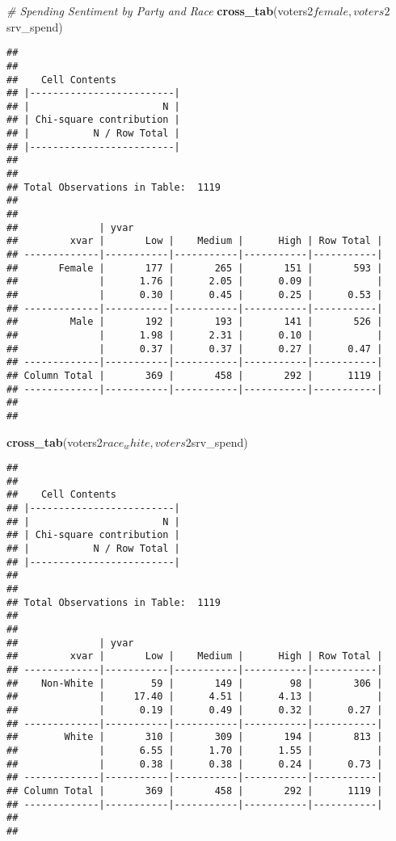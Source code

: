 \documentclass[]{article}
\newenvironment{Shaded}{\begin{snugshade}}{\end{snugshade}}
\newcommand{\KeywordTok}[1]{\textcolor[rgb]{0.13,0.29,0.53}{\textbf{{#1}}}}
\newcommand{\CommentTok}[1]{\textcolor[rgb]{0.56,0.35,0.01}{\textit{{#1}}}}
\newcommand{\NormalTok}[1]{{#1}}
\begin{document}
\begin{Shaded}
\begin{Highlighting}[]
\CommentTok{# Spending Sentiment by Party and Race}
\KeywordTok{cross_tab}\NormalTok{(voters2$female, voters2$srv_spend)}
\end{Highlighting}
\end{Shaded}

\begin{verbatim}
## 
##  
##    Cell Contents
## |-------------------------|
## |                       N |
## | Chi-square contribution |
## |           N / Row Total |
## |-------------------------|
## 
##  
## Total Observations in Table:  1119 
## 
##  
##              | yvar 
##         xvar |       Low |    Medium |      High | Row Total | 
## -------------|-----------|-----------|-----------|-----------|
##       Female |       177 |       265 |       151 |       593 | 
##              |      1.76 |      2.05 |      0.09 |           | 
##              |      0.30 |      0.45 |      0.25 |      0.53 | 
## -------------|-----------|-----------|-----------|-----------|
##         Male |       192 |       193 |       141 |       526 | 
##              |      1.98 |      2.31 |      0.10 |           | 
##              |      0.37 |      0.37 |      0.27 |      0.47 | 
## -------------|-----------|-----------|-----------|-----------|
## Column Total |       369 |       458 |       292 |      1119 | 
## -------------|-----------|-----------|-----------|-----------|
## 
## 
\end{verbatim}

\begin{Shaded}
\begin{Highlighting}[]
\KeywordTok{cross_tab}\NormalTok{(voters2$race_white, voters2$srv_spend)}
\end{Highlighting}
\end{Shaded}

\begin{verbatim}
## 
##  
##    Cell Contents
## |-------------------------|
## |                       N |
## | Chi-square contribution |
## |           N / Row Total |
## |-------------------------|
## 
##  
## Total Observations in Table:  1119 
## 
##  
##              | yvar 
##         xvar |       Low |    Medium |      High | Row Total | 
## -------------|-----------|-----------|-----------|-----------|
##    Non-White |        59 |       149 |        98 |       306 | 
##              |     17.40 |      4.51 |      4.13 |           | 
##              |      0.19 |      0.49 |      0.32 |      0.27 | 
## -------------|-----------|-----------|-----------|-----------|
##        White |       310 |       309 |       194 |       813 | 
##              |      6.55 |      1.70 |      1.55 |           | 
##              |      0.38 |      0.38 |      0.24 |      0.73 | 
## -------------|-----------|-----------|-----------|-----------|
## Column Total |       369 |       458 |       292 |      1119 | 
## -------------|-----------|-----------|-----------|-----------|
## 
## 
\end{verbatim}
\end{document}
